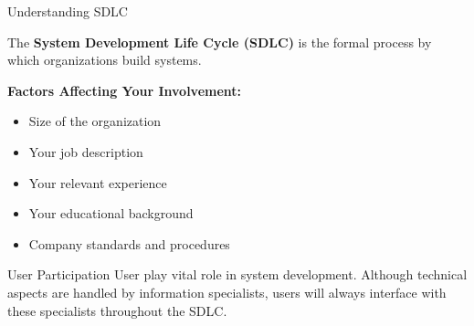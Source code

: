\documentclass[aspectratio=169]{beamer}
\begin{document}
\begin{frame}{Understanding SDLC}
    \begin{definition}
        The \textbf{System Development Life Cycle (SDLC)} is the formal process by which organizations build systems.
    \end{definition}
    
    \vspace{0.3cm}
    \textbf{Factors Affecting Your Involvement:}
    \begin{itemize}
        \item Size of the organization
        \item Your job description
        \item Your relevant experience
        \item Your educational background
        \item  Company standards and procedures
    \end{itemize}
    
    \vspace{0.3cm}
    \begin{exampleblock}{User Participation}
        User play vital role in system development. Although technical aspects are handled by information specialists, users will always interface with these specialists throughout the SDLC.
    \end{exampleblock}
\end{frame}
\end{document}
